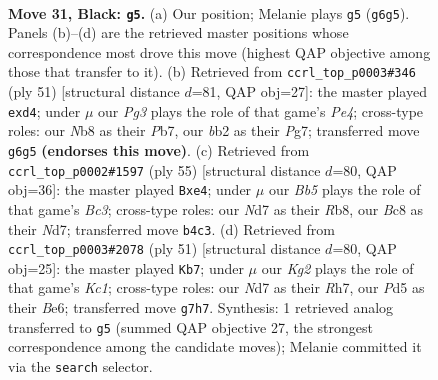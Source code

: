 \documentclass[11pt]{article}
\begin{document}
\clearpage

\begin{figure}[p]\centering
\begin{subfigure}{0.46\textwidth}\centering
\resizebox{\linewidth}{!}{%
\newchessgame
\chessboard[
  setfen={1nb5/rp1n2k1/5pp1/p2p3p/1b6/NP2P1PP/PBB1PK2/1R6 b - - 1 31},
  showmover=false,
  pgfstyle=straightmove, color=movearrow, markmove={g6-g5}
]}
\caption{}
\end{subfigure}\hfill
\begin{subfigure}{0.46\textwidth}\centering
\resizebox{\linewidth}{!}{%
\newchessgame
\chessboard[
  setfen={4k2r/1p2b1pp/4bpn1/3pp2B/3P3P/2N5/1BP2PP1/3R2K1 b k - 3 26},
  showmover=false,
  pgfstyle=straightmove, color=movearrow, markmove={e5-d4}
]}
\caption{}
\end{subfigure}
\\[4pt]
\begin{subfigure}{0.46\textwidth}\centering
\resizebox{\linewidth}{!}{%
\newchessgame
\chessboard[
  setfen={1r6/3n1kp1/1pbpp2p/2p5/2P1BP1P/2P1P3/3NK1P1/1R6 b - - 2 28},
  showmover=false,
  pgfstyle=straightmove, color=movearrow, markmove={c6-e4}
]}
\caption{}
\end{subfigure}\hfill
\begin{subfigure}{0.46\textwidth}\centering
\resizebox{\linewidth}{!}{%
\newchessgame
\chessboard[
  setfen={2k2b2/2p4r/4bp2/1p2p2p/1P2P1nN/P7/2RB1PP1/5NK1 b - - 0 26},
  showmover=false,
  pgfstyle=straightmove, color=movearrow, markmove={c8-b7}
]}
\caption{}
\end{subfigure}
\caption{\textbf{Move 31, Black: \texttt{g5}.} (a) Our position; Melanie plays \texttt{g5} (\texttt{g6g5}). Panels (b)--(d) are the retrieved master positions whose correspondence most drove this move (highest QAP objective among those that transfer to it). (b) Retrieved from \texttt{ccrl\_top\_p0003\#346} (ply 51) [structural distance $d$=81, QAP obj=27]: the master played \texttt{exd4}; under $\mu$ our \emph{Pg3} plays the role of that game's \emph{Pe4}; cross-type roles: our \emph{N}b8 as their \emph{P}b7, our \emph{b}b2 as their \emph{P}g7; transferred move \texttt{g6g5} \textbf{(endorses this move)}. (c) Retrieved from \texttt{ccrl\_top\_p0002\#1597} (ply 55) [structural distance $d$=80, QAP obj=36]: the master played \texttt{Bxe4}; under $\mu$ our \emph{Bb5} plays the role of that game's \emph{Bc3}; cross-type roles: our \emph{N}d7 as their \emph{R}b8, our \emph{B}c8 as their \emph{N}d7; transferred move \texttt{b4c3}. (d) Retrieved from \texttt{ccrl\_top\_p0003\#2078} (ply 51) [structural distance $d$=80, QAP obj=25]: the master played \texttt{Kb7}; under $\mu$ our \emph{Kg2} plays the role of that game's \emph{Kc1}; cross-type roles: our \emph{N}d7 as their \emph{R}h7, our \emph{P}d5 as their \emph{B}e6; transferred move \texttt{g7h7}. Synthesis: 1 retrieved analog transferred to \texttt{g5} (summed QAP objective 27, the strongest correspondence among the candidate moves); Melanie committed it via the \texttt{search} selector.}
\label{fig:thought-m61}
\end{figure}
\end{document}

